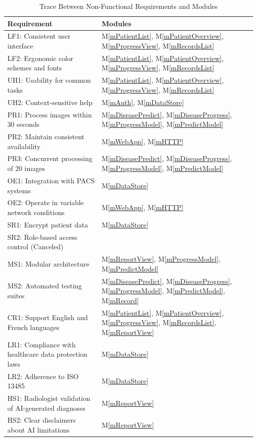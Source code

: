 \documentclass[12pt, titlepage]{article}
\newcommand{\mref}[1]{M\ref{#1}}
\begin{document}
\begin{table}[H]
\centering
\begin{tabular}{p{} p{}}
\toprule
\textbf{Requirement} & \textbf{Modules} \\
\midrule
LF1: Consistent user interface &\mref{mPatientList}, \mref{mPatientOverview}, \mref{mProgressView}, \mref{mRecordsList} \\
LF2: Ergonomic color schemes and fonts & \mref{mPatientList}, \mref{mPatientOverview}, \mref{mProgressView}, \mref{mRecordsList}\\
UH1: Usability for common tasks & \mref{mPatientList}, \mref{mPatientOverview}, \mref{mProgressView}, \mref{mRecordsList}\\
UH2: Context-sensitive help & \mref{mAuth}, \mref{mDataStore} \\
PR1: Process images within 30 seconds & \mref{mDiseasePredict}, \mref{mDiseaseProgress}, \mref{mProgressModel}, \mref{mPredictModel} \\
PR2: Maintain consistent availability & \mref{mWebApp}, \mref{mHTTP} \\
PR3: Concurrent processing of 20 images & \mref{mDiseasePredict}, \mref{mDiseaseProgress}, \mref{mProgressModel}, \mref{mPredictModel} \\
OE1: Integration with PACS systems & \mref{mDataStore} \\
OE2: Operate in variable network conditions & \mref{mWebApp}, \mref{mHTTP} \\
SR1: Encrypt patient data & \mref{mDataStore} \\
SR2: Role-based access control (Canceled) & \\
MS1: Modular architecture & \mref{mReportView}, \mref{mProgressModel}, \mref{mPredictModel} \\
MS2: Automated testing suites & \mref{mDiseasePredict}, \mref{mDiseaseProgress}, \mref{mProgressModel}, \mref{mPredictModel}, \mref{mRecord} \\
CR1: Support English and French languages & \mref{mPatientList}, \mref{mPatientOverview}, \mref{mProgressView}, \mref{mRecordsList}, \mref{mReportView}\\
LR1: Compliance with healthcare data protection laws & \mref{mDataStore} \\
LR2: Adherence to ISO 13485 & \mref{mDataStore} \\
HS1: Radiologist validation of AI-generated diagnoses & \mref{mReportView} \\
HS2: Clear disclaimers about AI limitations & \mref{mReportView} \\
\bottomrule
\end{tabular}
\caption{Trace Between Non-Functional Requirements and Modules}
\label{TblNFRModules}
\end{table}
\end{document}

